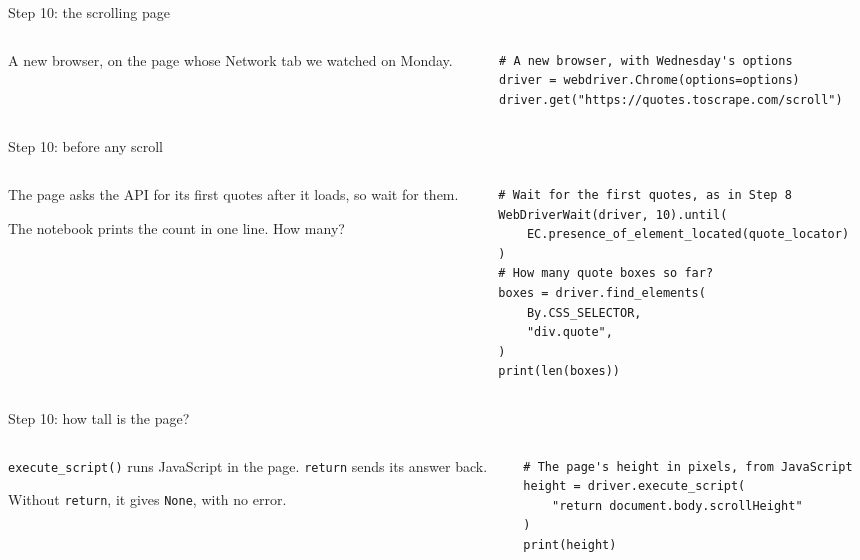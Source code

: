 \documentclass[9pt,aspectratio=169]{beamer}
\begin{document}
\begin{frame}[fragile]{Step 10: the scrolling page}
    \begin{columns}[T]
        \begin{column}{0.37\textwidth}
            A new browser, on the page whose Network tab we watched on Monday.
        \end{column}
        \begin{column}{0.6\textwidth}
\begin{lstlisting}[style=lab]
# A new browser, with Wednesday's options
driver = webdriver.Chrome(options=options)
driver.get("https://quotes.toscrape.com/scroll")
\end{lstlisting}
        \end{column}
    \end{columns}
\end{frame}

\begin{frame}[fragile]{Step 10: before any scroll}
    \begin{columns}[T]
        \begin{column}{0.37\textwidth}
            The page asks the API for its first quotes after it loads, so wait for them.

            \medskip
            The notebook prints the count in one line. How many?
        \end{column}
        \begin{column}{0.6\textwidth}
\begin{lstlisting}[style=lab]
# Wait for the first quotes, as in Step 8
WebDriverWait(driver, 10).until(
    EC.presence_of_element_located(quote_locator)
)
# How many quote boxes so far?
boxes = driver.find_elements(
    By.CSS_SELECTOR,
    "div.quote",
)
print(len(boxes))
\end{lstlisting}
        \end{column}
    \end{columns}
\end{frame}

\begin{frame}[fragile]{Step 10: how tall is the page?}
    \begin{columns}[T]
        \begin{column}{0.37\textwidth}
            \texttt{execute\_script()} runs JavaScript in the page. \texttt{return} sends its answer back.

            \medskip
            Without \texttt{return}, it gives \texttt{None}, with no error.
        \end{column}
        \begin{column}{0.6\textwidth}
\begin{lstlisting}[style=lab]
# The page's height in pixels, from JavaScript
height = driver.execute_script(
    "return document.body.scrollHeight"
)
print(height)
\end{lstlisting}
        \end{column}
    \end{columns}
\end{frame}
\end{document}
